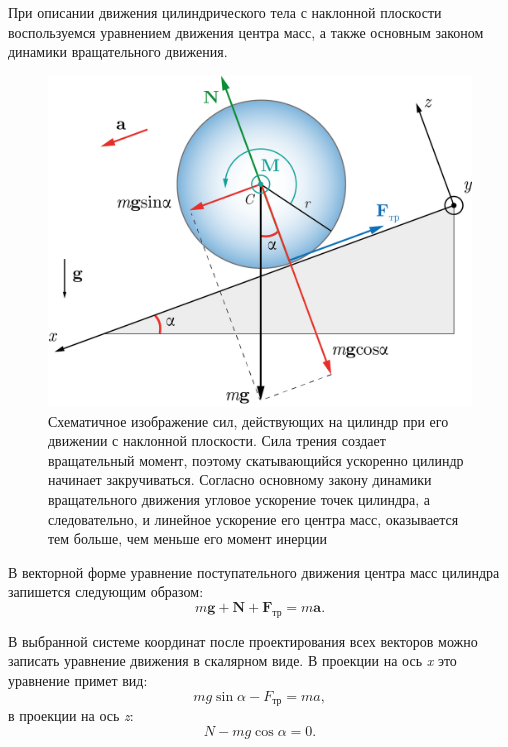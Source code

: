 \documentclass[14pt,a4paper,oneside]{extarticle}	%
\begin{document}
	При описании движения цилиндрического тела с наклонной плоскости воспользуемся уравнением движения центра масс, а также основным законом динамики вращательного движения.
	
	\begin{figure}[H] 	
		\centering 	
		\includegraphics[width=0.8\linewidth]{inclinedplane-3.png}
		\caption{Схематичное изображение сил, действующих на цилиндр при его движении с наклонной плоскости. Сила трения создает вращательный момент, поэтому скатывающийся ускоренно цилиндр начинает закручиваться. Согласно основному закону динамики вращательного движения угловое ускорение точек цилиндра, а следовательно, и линейное ускорение его центра масс, оказывается тем больше, чем меньше его момент инерции}
		\label{inclinedplane-3}
	\end{figure}

	В векторной форме уравнение поступательного движения центра масс цилиндра запишется следующим образом:
	\begin{equation}\label{inclinedplane-1eq1}
	m\textbf{g}+\textbf{N}+\textbf{F}_{\text{тр}} = m\textbf{a}.
	\end{equation} 
	
В выбранной системе координат после проектирования всех векторов можно записать уравнение движения в скалярном виде.
В проекции на ось  \textit{x}  это уравнение примет вид:
	\begin{equation}\label{inclinedplane-1eq2}
	mg\sin\alpha - F_{\text{тр}} = ma,
	\end{equation}
	в проекции на ось  \textit{z}:
	\begin{equation}\label{inclinedplane-1eq3}
	N - mg\cos\alpha = 0.
	\end{equation}
	
\end{document}
